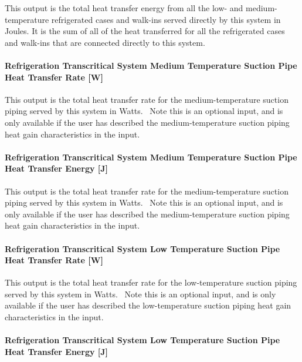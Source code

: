 This output is the total heat transfer energy from all the low- and medium-temperature refrigerated cases and walk-ins served directly by this system in Joules. It is the sum of all of the heat transferred for all the refrigerated cases and walk-ins that are connected directly to this system.

\paragraph{Refrigeration Transcritical System Medium Temperature Suction Pipe Heat Transfer Rate {[}W{]}}\label{refrigeration-transcritical-system-medium-temperature-suction-pipe-heat-transfer-rate-w}

This output is the total heat transfer rate for the medium-temperature suction piping served by this system in Watts.~ Note this is an optional input, and is only available if the user has described the medium-temperature suction piping heat gain characteristics in the input.

\paragraph{Refrigeration Transcritical System Medium Temperature Suction Pipe Heat Transfer Energy {[}J{]}}\label{refrigeration-transcritical-system-medium-temperature-suction-pipe-heat-transfer-energy-j}

This output is the total heat transfer rate for the medium-temperature suction piping served by this system in Watts.~ Note this is an optional input, and is only available if the user has described the medium-temperature suction piping heat gain characteristics in the input.

\paragraph{Refrigeration Transcritical System Low Temperature Suction Pipe Heat Transfer Rate {[}W{]}}\label{refrigeration-transcritical-system-low-temperature-suction-pipe-heat-transfer-rate-w}

This output is the total heat transfer rate for the low-temperature suction piping served by this system in Watts.~ Note this is an optional input, and is only available if the user has described the low-temperature suction piping heat gain characteristics in the input.

\paragraph{Refrigeration Transcritical System Low Temperature Suction Pipe Heat Transfer Energy {[}J{]}}\label{refrigeration-transcritical-system-low-temperature-suction-pipe-heat-transfer-energy-j}

